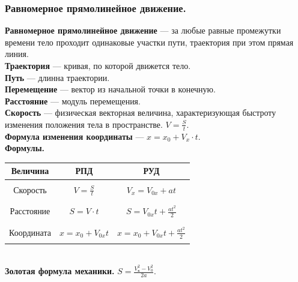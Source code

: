\documentclass{article}
\begin{document}
	\subsubsection{Равномерное прямолинейное движение.}
	\textbf{Равномерное прямолинейное движение} --- за любые равные промежутки времени тело проходит одинаковые участки пути, траектория при этом прямая линия. \\
	\textbf{Траектория} --- кривая, по которой движется тело. \\
	\textbf{Путь} --- длинна траектории. \\
	\textbf{Перемещение} --- вектор из начальной точки в конечную. \\
	\textbf{Расстояние} --- модуль перемещения. \\
	\textbf{Скорость} --- физическая векторная величина, характеризующая быстроту изменения положения тела в пространстве. $V = \frac{S}{t}$. \\
	\textbf{Формула изменения координаты} --- $x = x_0 + V_x \cdot t$. \\
	\textbf{Формулы.} \\
	\begin{tabular}{|c|c|c|}
		\hline
		\textbf{Величина} & \textbf{РПД} & \textbf{РУД} \\
		\hline
		 & & \\
		Скорость & $V = \frac{S}{t}$ & $V_x = V_{0x} + at$ \\
		 & & \\
		\hline
		 & & \\
		Расстояние & $S = V \cdot t$ & $S = V_{0x}t + \frac{at^2}{2}$ \\
		 & & \\
		\hline
		 & & \\
		Координата & $x = x_0 + V_{0x}t$ & $x = x_0 + V_{0x}t + \frac{at^2}{2}$ \\
		 & & \\
		\hline
	\end{tabular}
	\\
	\textbf{Золотая формула механики.} $S = \frac{V_{\text{к}}^2 - V_0^2}{2a}$.
\end{document}
